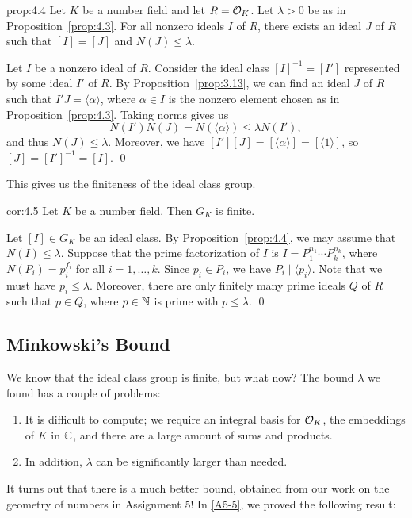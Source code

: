 \begin{prop}{prop:4.4}
    Let $K$ be a number field and let $R = {\cal O}_K$. Let $\lambda > 0$ 
    be as in Proposition~\ref{prop:4.3}. For all nonzero ideals $I$ of $R$, 
    there exists an ideal $J$ of $R$ such that $[I] = [J]$ and $N(J) \leq \lambda$. 
\end{prop}\vspace{-0.25cm}
\begin{pf}
    Let $I$ be a nonzero ideal of $R$. Consider the ideal class $[I]^{-1} = 
    [I']$ represented by some ideal $I'$ of $R$. By Proposition~\ref{prop:3.13},
    we can find an ideal $J$ of $R$ such that $I'J = \langle \alpha \rangle$, 
    where $\alpha \in I$ is the nonzero element chosen as in 
    Proposition~\ref{prop:4.3}. Taking norms gives us 
    \[ N(I') N(J) = N(\langle \alpha \rangle) \leq \lambda N(I'), \] 
    and thus $N(J) \leq \lambda$. Moreover, we have $[I'][J] 
    = [\langle \alpha \rangle] = [\langle 1 \rangle]$, so 
    $[J] = [I']^{-1} = [I]$. \qed 
\end{pf}\vspace{-0.25cm}

This gives us the finiteness of the ideal class group. 

\begin{cor}{cor:4.5}
    Let $K$ be a number field. Then $G_K$ is finite. 
\end{cor}\vspace{-0.25cm}
\begin{pf}
    Let $[I] \in G_K$ be an ideal class. By Proposition~\ref{prop:4.4}, 
    we may assume that $N(I) \leq \lambda$. Suppose that the 
    prime factorization of $I$ is $I = P_1^{n_1} \cdots P_k^{n_k}$,
    where $N(P_i) = p_i^{f_i}$ for all $i = 1, \dots, k$. Since $p_i \in P_i$, 
    we have $P_i \mid \langle p_i \rangle$. Note that we must have 
    $p_i \leq \lambda$. Moreover, there are only finitely many 
    prime ideals $Q$ of $R$ such that $p \in Q$, where $p \in \mathbb{N}$ is prime 
    with $p \leq \lambda$. \qed 
\end{pf}\newpage 

\subsection{Minkowski's Bound} \label{subsec:4.2}
We know that the ideal class group is finite, but what now? The bound 
$\lambda$ we found has a couple of problems: 
\begin{enumerate}[(1)]
    \item It is difficult to compute; we require an integral basis
    for ${\cal O}_K$, the embeddings of $K$ in $\mathbb{C}$, and there are a large 
    amount of sums and products.
    \item In addition, $\lambda$ can be significantly larger than needed. 
\end{enumerate}
It turns out that there is a much better bound, obtained from 
our work on the geometry of numbers in Assignment 5! In \ref{A5-5}, 
we proved the following result:

